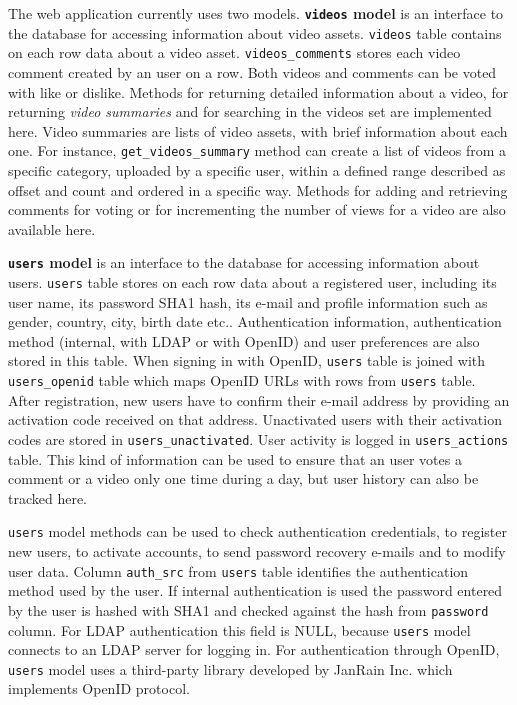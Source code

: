 The web application currently uses two models. \textbf{\texttt{videos} model} is an interface to the database for accessing information about video assets. \texttt{videos} table contains on each row data about a video asset. \texttt{videos_comments} stores each video comment created by an user on a row. Both videos and comments can be voted with like or dislike. Methods for returning detailed information about a video, for returning \textit{video summaries} and for searching in the videos set are implemented here. Video summaries are lists of video assets, with brief information about each one. For instance, \texttt{get_videos_summary} method can create a list of videos from a specific category, uploaded by a specific user, within a defined range described as offset and count and ordered in a specific way. Methods for adding and retrieving comments for voting or for incrementing the number of views for a video are also available here.

\textbf{\texttt{users} model} is an interface to the database for accessing information about users. \texttt{users} table stores on each row data about a registered user, including its user name, its password SHA1 hash, its e-mail and profile information such as gender, country, city, birth date etc.. Authentication information, authentication method (internal, with LDAP or with OpenID) and user preferences are also stored in this table. When signing in with OpenID, \texttt{users} table is joined with \texttt{users_openid} table which maps OpenID URLs with rows from \texttt{users} table. After registration, new users have to confirm their e-mail address by providing an activation code received on that address. Unactivated users with their activation codes are stored in \texttt{users_unactivated}. User activity is logged in \texttt{users_actions} table. This kind of information can be used to ensure that an user votes a comment or a video only one time during a day, but user history can also be tracked here.

\texttt{users} model methods can be used to check authentication credentials, to register new users, to activate accounts, to send password recovery e-mails and to modify user data. Column \texttt{auth_src} from \texttt{users} table identifies the authentication method used by the user. If internal authentication is used the password entered by the user is hashed with SHA1 and checked against the hash from \texttt{password} column. For LDAP authentication this field is NULL, because \texttt{users} model connects to an LDAP server for logging in. For authentication through OpenID, \texttt{users} model uses a third-party library developed by JanRain Inc. \cite{janrain-openid} which implements OpenID protocol.

